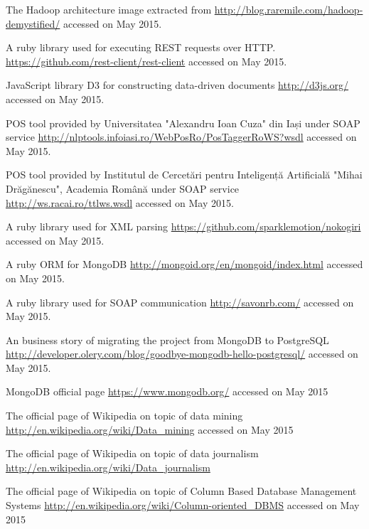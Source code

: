 \begin{thebibliography}{99999}
\singlespace\normalsize


 The Hadoop architecture image extracted from \url{http://blog.raremile.com/hadoop-demystified/} accessed on May 2015.

 A ruby library used for executing REST requests over HTTP. \url{https://github.com/rest-client/rest-client} accessed on May 2015.

 JavaScript library D3 for constructing data-driven documents \url{http://d3js.org/} accessed on May 2015.

 POS tool provided by Universitatea "Alexandru Ioan Cuza" din Iași under SOAP service \url{http://nlptools.infoiasi.ro/WebPosRo/PosTaggerRoWS?wsdl} accessed on May 2015.

 POS tool provided by Institutul de Cercetări pentru Inteligență Artificială "Mihai Drăgănescu", Academia Română under SOAP service \url{http://ws.racai.ro/ttlws.wsdl} accessed on May 2015.

 A ruby library used for XML parsing \url{https://github.com/sparklemotion/nokogiri} accessed on May 2015.

 A ruby ORM for MongoDB \url{http://mongoid.org/en/mongoid/index.html} accessed on May 2015.

 A ruby library used for SOAP communication \url{http://savonrb.com/} accessed on May 2015.

 An business story of migrating the project from MongoDB to PostgreSQL \url{http://developer.olery.com/blog/goodbye-mongodb-hello-postgresql/} accessed on May 2015.

 MongoDB official page \url{https://www.mongodb.org/} accessed on May 2015

 The official page of Wikipedia on topic of data mining \url{http://en.wikipedia.org/wiki/Data_mining} accessed on May 2015



 The official page of Wikipedia on topic of data journalism \url{http://en.wikipedia.org/wiki/Data_journalism}

 The official page of Wikipedia on topic of Column Based Database Management Systems \url{http://en.wikipedia.org/wiki/Column-oriented_DBMS} accessed on May 2015



\end{thebibliography}
